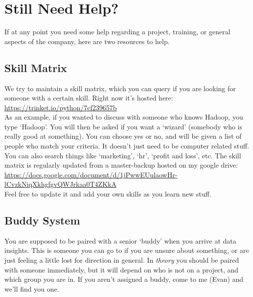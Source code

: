 \documentclass[11pt]{report}
\begin{document}
\section{Still Need Help?}
\label{help}
If at any point you need some help regarding a project, training, or general aspects of the company, here are two resources to help.

\subsection{Skill Matrix}
We try to maintain a skill matrix, which you can query if you are looking for someone with a certain skill. Right now it's hosted here:\\
\href{https://trinket.io/python/7cf239657b}{https://trinket.io/python/7cf239657b}\\
As an example, if you wanted to discuss with someone who knows Hadoop, you type `Hadoop'. You will then be asked if you want a `wizard' (somebody who is really good at something). You can choose yes or no, and will be given a list of people who match your criteria. It doesn't just need to be computer related stuff. You can also search things like `marketing', `hr', `profit and loss', etc. The skill matrix is regularly updated from a master-backup hosted on my google drive:\\
\href{https://docs.google.com/document/d/1jPwwEUulaowHr-lCvzkNiqXkhgfgvQWJrkaa0T4ZKkA/edit?usp=sharing}{\scriptsize https://docs.google.com/document/d/1jPwwEUulaowHr-lCvzkNiqXkhgfgvQWJrkaa0T4ZKkA}\\
Feel free to update it and add your own skills as you learn new stuff.

\subsection{Buddy System}
You are supposed to be paired with a senior `buddy' when you arrive at data insights. This is someone you can go to if you are unsure about something, or are just feeling a little lost for direction in general. In \emph{theory} you should be paired with someone immediately, but it will depend on who is not on a project, and which group you are in. If you aren't assigned a buddy, come to me (Evan) and we'll find you one.
\end{document}
